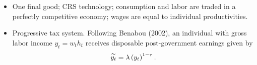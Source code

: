 \documentclass[notes=show]{beamer}
\begin{document}
\begin{frame}%



\begin{itemize}
\item One final good; CRS technology; consumption and labor are traded in a
perfectly competitive economy; wages are equal to individual productivities.

\item Progressive tax system. Following Benabou (2002), an individual with
gross labor income $y_{t}=w_{t}h_{t}$ receives disposable post-government
earnings given by 
\begin{equation}
\overset{\thicksim }{y_{t}}=\lambda \left( y_{t}\right) ^{1-\tau }.
\end{equation}
\end{itemize}

\transboxout%
\end{frame}%

\bigskip
\end{document}
